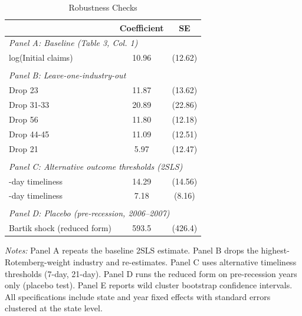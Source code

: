 \begin{table}[H]
\centering
\caption{Robustness Checks}
\begin{threeparttable}
\begin{tabular}{lcc}
\toprule
 & Coefficient & SE \\
\midrule
\multicolumn{3}{l}{\textit{Panel A: Baseline (Table 3, Col. 1)}} \\
\quad log(Initial claims) & 10.96 & (12.62) \\
 & & \\
\multicolumn{3}{l}{\textit{Panel B: Leave-one-industry-out}} \\
\quad Drop 23 & 11.87 & (13.62) \\
\quad Drop 31-33 & 20.89 & (22.86) \\
\quad Drop 56 & 11.80 & (12.18) \\
\quad Drop 44-45 & 11.09 & (12.51) \\
\quad Drop 21 & 5.97 & (12.47) \\
 & & \\
\multicolumn{3}{l}{\textit{Panel C: Alternative outcome thresholds (2SLS)}} \\
\quad 7-day timeliness & 14.29 & (14.56) \\
\quad 21-day timeliness & 7.18 & (8.16) \\
 & & \\
\multicolumn{3}{l}{\textit{Panel D: Placebo (pre-recession, 2006--2007)}} \\
\quad Bartik shock (reduced form) & 593.5 & (426.4) \\
\bottomrule
\end{tabular}
\begin{tablenotes}[flushleft]
\small
\item \textit{Notes:} Panel A repeats the baseline 2SLS estimate. Panel B drops the highest-Rotemberg-weight industry and re-estimates. Panel C uses alternative timeliness thresholds (7-day, 21-day). Panel D runs the reduced form on pre-recession years only (placebo test). Panel E reports wild cluster bootstrap confidence intervals. All specifications include state and year fixed effects with standard errors clustered at the state level.
\end{tablenotes}
\end{threeparttable}
\label{tab:robust}
\end{table}
